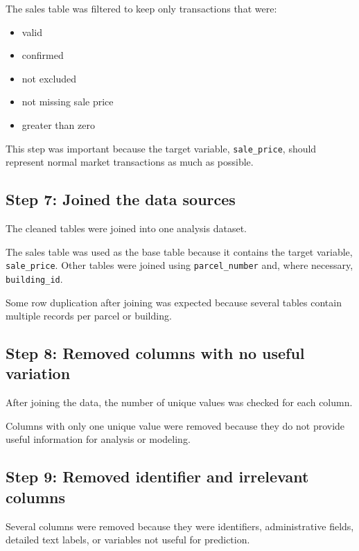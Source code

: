 \documentclass[
  english,
  letterpaper,
  DIV=11,
  numbers=noendperiod]{scrreprt}
\begin{document}
The sales table was filtered to keep only transactions that were:

\begin{itemize}
\item
  valid
\item
  confirmed
\item
  not excluded
\item
  not missing sale price
\item
  greater than zero
\end{itemize}

This step was important because the target variable,
\texttt{sale\_price}, should represent normal market transactions as
much as possible.

\subsection{Step 7: Joined the data
sources}\label{step-7-joined-the-data-sources}

The cleaned tables were joined into one analysis dataset.

The sales table was used as the base table because it contains the
target variable, \texttt{sale\_price}. Other tables were joined using
\texttt{parcel\_number} and, where necessary, \texttt{building\_id}.

Some row duplication after joining was expected because several tables
contain multiple records per parcel or building.

\subsection{Step 8: Removed columns with no useful
variation}\label{step-8-removed-columns-with-no-useful-variation}

After joining the data, the number of unique values was checked for each
column.

Columns with only one unique value were removed because they do not
provide useful information for analysis or modeling.

\subsection{Step 9: Removed identifier and irrelevant
columns}\label{step-9-removed-identifier-and-irrelevant-columns}

Several columns were removed because they were identifiers,
administrative fields, detailed text labels, or variables not useful for
prediction.
\end{document}
